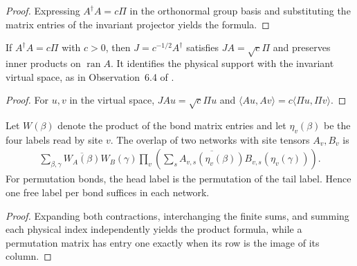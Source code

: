 \begin{proof}\leanok
    Expressing $A^\dagger A=c\Pi$ in the orthonormal group basis and substituting
    the matrix entries of the invariant projector yields the formula.
\end{proof}

\begin{lemma}%
    \label{thm:peps_torus_accessible_virtual_site}
    \leanok
    If $A^\dagger A=c\Pi$ with $c>0$, then $J=c^{-1/2}A^\dagger$
    satisfies $JA=\sqrt{c}\Pi$ and preserves inner products on
    $\operatorname{ran}A$. It identifies the physical support with
    the invariant virtual space, as in Observation~6.4 of
    \cite{Schuch2010PEPS}.
\end{lemma}

\begin{proof}\leanok
    For $u,v$ in the virtual space, $JA u=\sqrt{c}\Pi u$ and
    $\langle Au,Av\rangle=c\langle\Pi u,\Pi v\rangle$.
\end{proof}

\begin{lemma}%
    \label{thm:peps_torus_overlap_expansion}
    \leanok
    Let $W(\beta)$ denote the product of the bond matrix entries and
    let $\eta_v(\beta)$ be the four labels read by site $v$.
    The overlap of two networks with site tensors $A_v,B_v$ is
    \begin{align}
        \sum_{\beta,\gamma}\overline{W_A(\beta)}W_B(\gamma)
        \prod_v\left(\sum_s
        \overline{A_{v,s}(\eta_v(\beta))}
        B_{v,s}(\eta_v(\gamma))\right).
    \end{align}
    For permutation bonds, the head label is the permutation of the
    tail label. Hence one free label per bond suffices in each network.
\end{lemma}

\begin{proof}\leanok
    Expanding both contractions, interchanging the finite sums, and summing each
    physical index independently yields the product formula, while a permutation matrix has entry one
    exactly when its row is the image of its column.
\end{proof}

